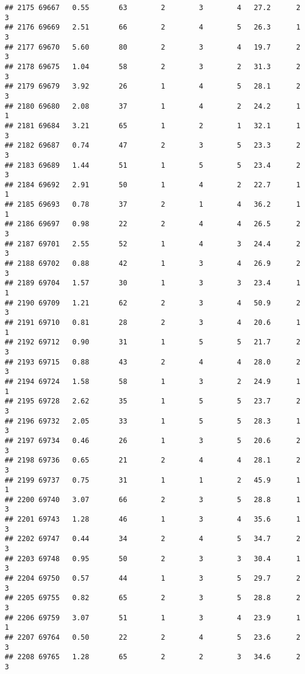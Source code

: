 \documentclass[
]{article}
\begin{document}
\begin{verbatim}
## 2175 69667   0.55       63        2        3        4   27.2      2      3
## 2176 69669   2.51       66        2        4        5   26.3      1      3
## 2177 69670   5.60       80        2        3        4   19.7      2      3
## 2178 69675   1.04       58        2        3        2   31.3      2      3
## 2179 69679   3.92       26        1        4        5   28.1      2      3
## 2180 69680   2.08       37        1        4        2   24.2      1      1
## 2181 69684   3.21       65        1        2        1   32.1      1      3
## 2182 69687   0.74       47        2        3        5   23.3      2      3
## 2183 69689   1.44       51        1        5        5   23.4      2      3
## 2184 69692   2.91       50        1        4        2   22.7      1      1
## 2185 69693   0.78       37        2        1        4   36.2      1      1
## 2186 69697   0.98       22        2        4        4   26.5      2      3
## 2187 69701   2.55       52        1        4        3   24.4      2      3
## 2188 69702   0.88       42        1        3        4   26.9      2      3
## 2189 69704   1.57       30        1        3        3   23.4      1      1
## 2190 69709   1.21       62        2        3        4   50.9      2      3
## 2191 69710   0.81       28        2        3        4   20.6      1      1
## 2192 69712   0.90       31        1        5        5   21.7      2      3
## 2193 69715   0.88       43        2        4        4   28.0      2      3
## 2194 69724   1.58       58        1        3        2   24.9      1      1
## 2195 69728   2.62       35        1        5        5   23.7      2      3
## 2196 69732   2.05       33        1        5        5   28.3      1      3
## 2197 69734   0.46       26        1        3        5   20.6      2      3
## 2198 69736   0.65       21        2        4        4   28.1      2      3
## 2199 69737   0.75       31        1        1        2   45.9      1      1
## 2200 69740   3.07       66        2        3        5   28.8      1      3
## 2201 69743   1.28       46        1        3        4   35.6      1      3
## 2202 69747   0.44       34        2        4        5   34.7      2      3
## 2203 69748   0.95       50        2        3        3   30.4      1      3
## 2204 69750   0.57       44        1        3        5   29.7      2      3
## 2205 69755   0.82       65        2        3        5   28.8      2      3
## 2206 69759   3.07       51        1        3        4   23.9      1      1
## 2207 69764   0.50       22        2        4        5   23.6      2      3
## 2208 69765   1.28       65        2        2        3   34.6      2      3

\end{verbatim}
\end{document}

